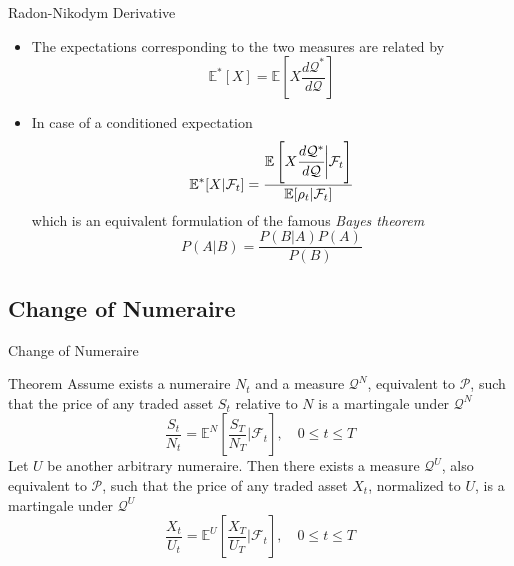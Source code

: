 \documentclass{beamer}
\begin{document}
\begin{frame}{Radon-Nikodym Derivative}
\begin{itemize}
	\item The expectations corresponding to the two measures are related by
	\begin{equation*}
		\mathbb{E}^*[X] = \mathbb{E}\left[X\frac{d\mathcal{Q}^*}{d\mathcal{Q}}\right]
	\end{equation*}
	\item In case of a conditioned expectation
	\begin{equation}
		\mathbb{E}^*[X|\mathcal{F}_t] = \frac{\mathbb{E}\left[X\cfrac{d\mathcal{Q}^*}{d\mathcal{Q}}\bigg|\mathcal{F}_t\right]}{\mathbb{E}[\rho_t|\mathcal{F}_t]}
		\label{eq:conditioned_expectation}
	\end{equation}
	which is an equivalent formulation of the famous \emph{Bayes theorem}
 	\begin{equation*}
		P(A|B)=\frac{P(B|A)P(A)}{P(B)}
	\end{equation*}
\end{itemize}
\end{frame}

\subsection{Change of Numeraire}
\begin{frame}{Change of Numeraire}
	\begin{block}{Theorem}
	Assume exists a numeraire $N_t$ and a measure $\mathcal{Q}^N$, equivalent to $\mathcal{P}$, such that the price of any traded asset $S_t$ relative to $N$ is a martingale under $\mathcal{Q}^N$
	\begin{equation*}
		\frac{S_t}{N_t} = \mathbb{E}^N\left[\frac{S_T}{N_T}\bigg|\mathcal{F}_t\right],\quad 0\le t \le T
	\end{equation*}
	Let $U$ be another arbitrary numeraire. Then there exists a measure $\mathcal{Q}^U$, also equivalent to $\mathcal{P}$, such that the price of any traded asset $X_t$, normalized to $U$, is a martingale under $\mathcal{Q}^U$
	\begin{equation*}
		\frac{X_t}{U_t} = \mathbb{E}^U\left[\frac{X_T}{U_T}\bigg|\mathcal{F}_t\right],\quad 0\le t \le T
	\end{equation*}
	\end{block}
\end{frame}	
\end{document}
